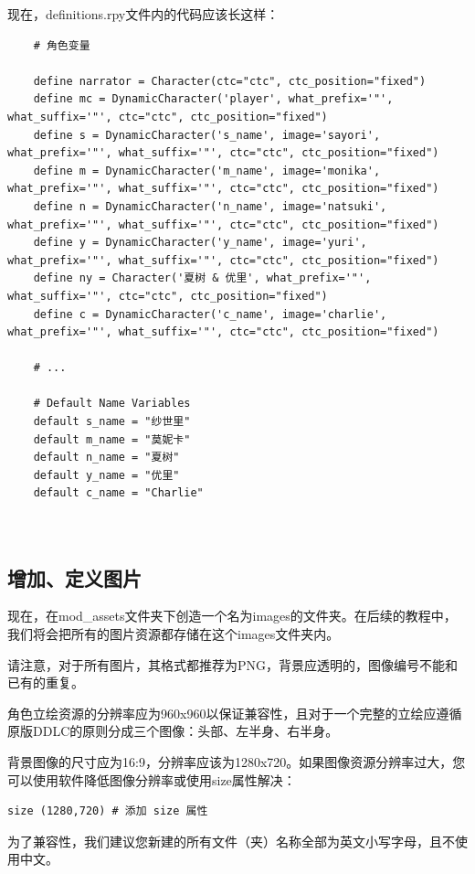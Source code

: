 \documentclass[../../Main.tex]{subfiles}
\begin{document}
现在，definitions.rpy文件内的代码应该长这样：
\begin{lstlisting}
    # 角色变量

    define narrator = Character(ctc="ctc", ctc_position="fixed")
    define mc = DynamicCharacter('player', what_prefix='"', what_suffix='"', ctc="ctc", ctc_position="fixed")
    define s = DynamicCharacter('s_name', image='sayori', what_prefix='"', what_suffix='"', ctc="ctc", ctc_position="fixed")
    define m = DynamicCharacter('m_name', image='monika', what_prefix='"', what_suffix='"', ctc="ctc", ctc_position="fixed")
    define n = DynamicCharacter('n_name', image='natsuki', what_prefix='"', what_suffix='"', ctc="ctc", ctc_position="fixed")
    define y = DynamicCharacter('y_name', image='yuri', what_prefix='"', what_suffix='"', ctc="ctc", ctc_position="fixed")
    define ny = Character('夏树 & 优里', what_prefix='"', what_suffix='"', ctc="ctc", ctc_position="fixed")
    define c = DynamicCharacter('c_name', image='charlie', what_prefix='"', what_suffix='"', ctc="ctc", ctc_position="fixed")
    
    # ...
    
    # Default Name Variables
    default s_name = "纱世里"
    default m_name = "莫妮卡"
    default n_name = "夏树"
    default y_name = "优里"
    default c_name = "Charlie"
    
    
\end{lstlisting}

\subsection{增加、定义图片}

现在，在mod\_assets文件夹下创造一个名为images的文件夹。在后续的教程中，我们将会把所有的图片资源都存储在这个images文件夹内。

\begin{Warning}
请注意，对于所有图片，其格式都推荐为PNG，背景应透明的，图像编号不能和已有的重复。

角色立绘资源的分辨率应为960x960以保证兼容性，且对于一个完整的立绘应遵循原版DDLC的原则分成三个图像：头部、左半身、右半身。

背景图像的尺寸应为16:9，分辨率应该为1280x720。如果图像资源分辨率过大，您可以使用软件降低图像分辨率或使用size属性解决：
\begin{lstlisting}
size (1280,720) # 添加 size 属性
\end{lstlisting}

为了兼容性，我们建议您新建的所有文件（夹）名称全部为英文小写字母，且不使用中文。
\end{Warning}
\end{document}
